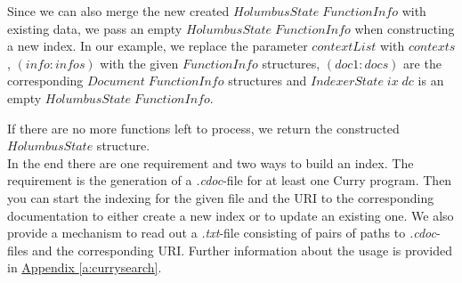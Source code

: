 \documentclass[%
	pdftex,%
	a4paper,%
	oneside,%
	chapterprefix,%
	headsepline,%
	12pt%
]{scrbook}
\makeatletter
\newcommand{\Conid}[1]{\mathit{#1}}
\newcommand{\Varid}[1]{\mathit{#1}}
\newcommand{\anonymous}{\kern0.06em \vbox{\hrule\@width.5em}}
\def\resethooks{%
  \global\let\SaveRestoreHook\empty
  \global\let\ColumnHook\empty}
\let\hspre\empty
\let\hspost\empty
\makeatother
\begin{document}
Since we can also merge the new created \ensuremath{\Conid{HolumbusState}\;\Conid{FunctionInfo}}
with existing data, we pass an empty \ensuremath{\Conid{HolumbusState}\;\Conid{FunctionInfo}} when
constructing a new index. %
In our example, we replace the parameter \ensuremath{\Varid{contextList}} with
\ensuremath{\Varid{contexts}}, \ensuremath{(\Varid{info}\mathbin{:}\Varid{infos})} with the given \ensuremath{\Conid{FunctionInfo}} structures,
\ensuremath{(\Varid{doc1}\mathbin{:}\Varid{docs})} are the corresponding \ensuremath{\Conid{Document}\;\Conid{FunctionInfo}} structures
and \ensuremath{\Conid{IndexerState}\;\Varid{ix}\;\Varid{dc}} is an empty \ensuremath{\Conid{HolumbusState}\;\Conid{FunctionInfo}}. %

\resethooks

If there are no more functions left to process, we return the
constructed \ensuremath{\Conid{HolumbusState}} structure. \\

In the end there are one requirement and two ways to build an index. %
The requirement is the generation of a \emph{.cdoc}-file for at least
one Curry program. %
Then you can start the indexing for the given file and the URI to the
corresponding documentation to either create a new index or to update
an existing one. %
We also provide a mechanism to read out a \emph{.txt}-file consisting
of pairs of paths to \emph{.cdoc}-files and the corresponding URI. %
Further information about the usage is provided in
\hyperref[a:currysearch]{Appendix \ref{a:currysearch}}. %



\end{document}
